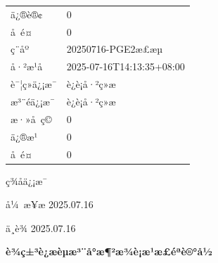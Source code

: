 \documentclass[UTF8,10pt,a4paper,fontset=fandol]{ctexart}
\newcommand{\fieldvalue}[1]{#1}
\newcommand{\handwritten}[1]{#1}
\begin{document}
\medskip
\noindent
\begin{tabular}{ll}
ä¿®è®¢ &
\fieldvalue{0} \\

å é¤ &
\fieldvalue{0} \\

ç¨åº &
\fieldvalue{20250716-PGE2æ£æµ} \\

å·²æ¹å &
\fieldvalue{2025-07-16T14:13:35+08:00} \\

è¯¦ç»ä¿¡æ¯ &
\fieldvalue{è¿è¡å·²ç»æ} \\

æ³¨éä¿¡æ¯ &
\fieldvalue{è¿è¡å·²ç»æ} \\

æ·»å ç© &
\fieldvalue{0} \\

ä¿®æ¹ &
\fieldvalue{0} \\

å é¤ &
\fieldvalue{0}
\end{tabular}

\medskip
ç­¾åä¿¡æ¯

\vfill

\handwritten{å¼ æ¥æ}\quad
\handwritten{2025.07.16}

\medskip

\handwritten{ä¸è¾}\quad
\handwritten{2025.07.16}

\newpage

\begin{center}
\textbf{è¾ç±³è¿æèµæ³¨å°æ¶²æ¾è¡æ¹æ£éªè®°å½}
\end{center}
\end{document}
